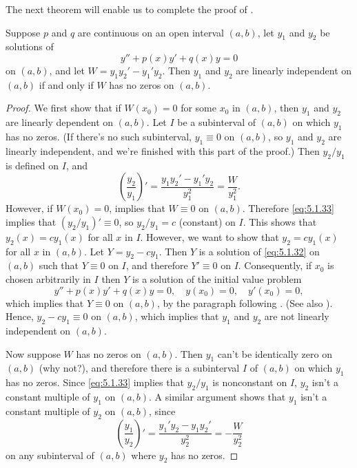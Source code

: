 The next theorem will enable us to complete the proof of
.

\begin{theorem}\label{thmtype:5.1.5}
 Suppose  $p$ and $q$ are continuous on an open interval $(a,b)$,
 let $y_1$ and $y_2$ be solutions of
\begin{equation}\label{eq:5.1.32}
y''+p(x)y'+q(x)y=0
\end{equation}
on  $(a,b)$, and let $W=y_1y_2'-y_1'y_2$.
Then $y_1$ and $y_2$ are linearly independent on  $(a,b)$ if and only
if $W$ has no zeros on  $(a,b)$.
\end{theorem}

\begin{proof}
We first show that if $W(x_0)=0$ for some $x_0$ in  $(a,b)$, then
$y_1$ and $y_2$ are linearly dependent on  $(a,b)$.  Let $I$ be a
subinterval
of  $(a,b)$ on which $y_1$ has no zeros. (If there's no such
subinterval, $y_1\equiv0$ on  $(a,b)$, so $y_1$ and $y_2$
are linearly independent, and we're finished with this part of the
proof.) Then $y_2/y_1$ is defined on $I$, and
\begin{equation}\label{eq:5.1.33}
\left(\frac{y_2}{y_1}\right)'=\frac{y_1y_2'-y_1'y_2}{y_1^2}=\frac{W}{y_1^2}.
\end{equation}
However, if $W(x_0)=0$,
 implies that $W\equiv0$ on  $(a,b)$.
Therefore \eqref{eq:5.1.33} implies that  $(y_2/y_1)'\equiv0$, so
$y_2/y_1=c$ (constant) on $I$. This shows that $y_2(x)=cy_1(x)$
for all $x$ in $I$. However, we want to show that $y_2=cy_1(x)$
for all $x$ in  $(a,b)$.
Let $Y=y_2-cy_1$. Then $Y$ is a solution of \eqref{eq:5.1.32}
on  $(a,b)$ such that $Y\equiv0$ on $I$, and therefore $Y'\equiv0$ on
$I$. Consequently, if $x_0$  is chosen arbitrarily in  $I$ then
$Y$ is a solution of the initial value problem
\[
y''+p(x)y'+q(x)y=0,\quad y(x_0)=0,\quad y'(x_0)=0,
\]
which implies that $Y\equiv0$ on  $(a,b)$,
by the paragraph following
. (See also ).
 Hence, $y_2-cy_1\equiv0$
on  $(a,b)$, which implies that $y_1$ and $y_2$ are not linearly
independent on  $(a,b)$.

Now suppose   $W$ has no zeros on  $(a,b)$.  Then $y_1$
can't be identically zero on  $(a,b)$ (why not?), and therefore there
is a subinterval $I$ of  $(a,b)$ on which $y_1$ has no zeros. Since
\eqref{eq:5.1.33} implies that $y_2/y_1$ is nonconstant on $I$,
$y_2$ isn't  a constant multiple of $y_1$ on  $(a,b)$.
A similar argument shows that $y_1$ isn't  a constant multiple of
$y_2$ on  $(a,b)$, since
\[
\left(\frac{y_1}{y_2}\right)'=\frac{y_1'y_2-y_1y_2'}{y_2^2}=-\frac{W}{y_2^2}
\]
on any subinterval of  $(a,b)$ where $y_2$ has no zeros.
\end{proof}

